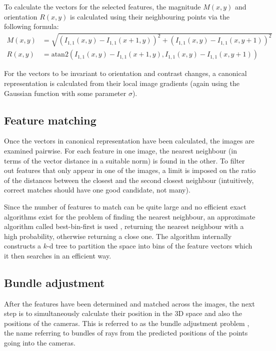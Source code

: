 To calculate the vectors for the selected features, the magnitude $M(x,y)$ and orientation $R(x,y)$ is calculated using their neighbouring points via the following formula:
\begin{align}
	M(x,y) &= \sqrt{\left(I_{1,1}(x, y) - I_{1,1}(x + 1, y)\right)^2 + \left(I_{1,1}(x,y) - I_{1,1}(x, y + 1)\right)^2} \\[0.7em]
	R(x,y) &= \mathrm{atan2} \left(I_{1,1}(x, y) - I_{1,1}(x + 1, y), I_{1,1}(x,y) - I_{1,1}(x, y + 1)\right)
\end{align}

For the vectors to be invariant to orientation and contrast changes, a canonical representation is calculated from their local image gradients (again using the Gaussian function with some parameter $\sigma$).

\subsection{Feature matching}
Once the vectors in canonical representation have been calculated, the images are examined pairwise.
For each feature in one image, the nearest neighbour (in terms of the vector distance in a suitable norm) is found in the other.
To filter out features that only appear in one of the images, a limit is imposed on the ratio of the distances between the closest and the second closest neighbour (intuitively, correct matches should have one good candidate, not many).

Since the number of features to match can be quite large and no efficient exact algorithms exist for the problem of finding the nearest neighbour, an approximate algorithm called best-bin-first is used \cite{beis1997shape}, returning the nearest neighbour with a high probability, otherwise returning a close one.
The algorithm internally constructs a $k$-d tree to partition the space into bins of the feature vectors which it then searches in an efficient way.

\subsection{Bundle adjustment}
After the features have been determined and matched across the images, the next step is to simultaneously calculate their position in the 3D space and also the positions of the cameras.
This is referred to as the bundle adjustment problem \cite{snavely2008modeling,schneider19913}, the name referring to bundles of rays from the predicted positions of the points going into the cameras.

